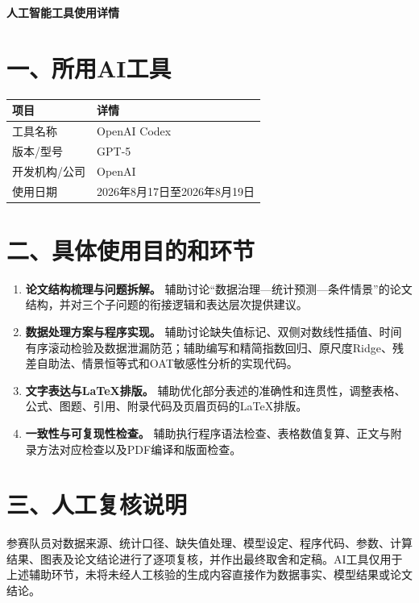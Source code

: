 \documentclass[12pt,a4paper,fontset=none]{ctexart}
\begin{document}
\begin{center}
  {\bfseries 人工智能工具使用详情\par}
\end{center}

\section*{一、所用AI工具}
\begin{table}[htbp]
\centering
\renewcommand{\arraystretch}{1.25}
\begin{tabularx}{\textwidth}{p{3.3cm}L}
\toprule
项目 & 详情 \\
\midrule
工具名称 & OpenAI Codex \\
版本/型号 & GPT-5 \\
开发机构/公司 & OpenAI \\
使用日期 & 2026年8月17日至2026年8月19日 \\
\bottomrule
\end{tabularx}
\end{table}

\section*{二、具体使用目的和环节}
\begin{enumerate}[leftmargin=2.3em,itemsep=0.55em]
  \item \textbf{论文结构梳理与问题拆解。}
  辅助讨论“数据治理—统计预测—条件情景”的论文结构，并对三个子问题的衔接逻辑和表达层次提供建议。

  \item \textbf{数据处理方案与程序实现。}
  辅助讨论缺失值标记、双侧对数线性插值、时间有序滚动检验及数据泄漏防范；辅助编写和精简指数回归、原尺度Ridge、残差自助法、情景恒等式和OAT敏感性分析的实现代码。

  \item \textbf{文字表达与\LaTeX{}排版。}
  辅助优化部分表述的准确性和连贯性，调整表格、公式、图题、引用、附录代码及页眉页码的\LaTeX{}排版。

  \item \textbf{一致性与可复现性检查。}
  辅助执行程序语法检查、表格数值复算、正文与附录方法对应检查以及PDF编译和版面检查。
\end{enumerate}

\section*{三、人工复核说明}
参赛队员对数据来源、统计口径、缺失值处理、模型设定、程序代码、参数、计算结果、图表及论文结论进行了逐项复核，并作出最终取舍和定稿。AI工具仅用于上述辅助环节，未将未经人工核验的生成内容直接作为数据事实、模型结果或论文结论。
\end{document}
